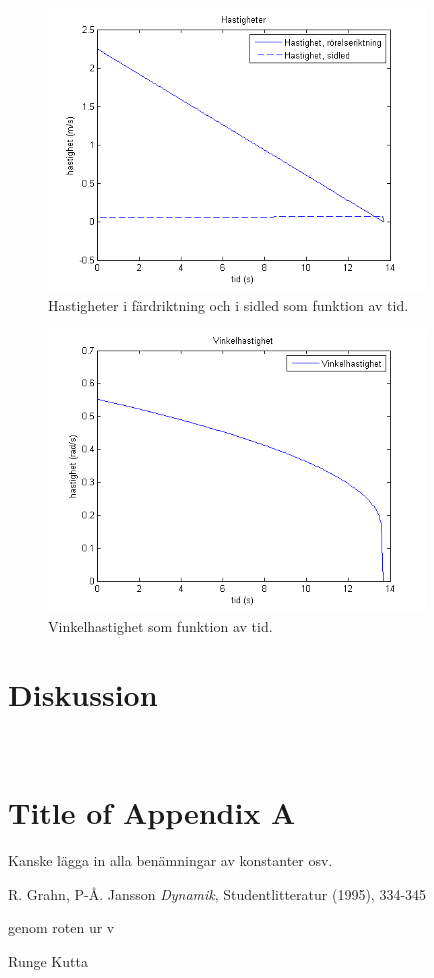 \documentclass[11pt]{article} %
\begin{document}
\begin{figure}[ht!]
\centering
\includegraphics[width=100mm]{hastigheter_tid_graf.png}
\caption{Hastigheter i färdriktning och i sidled som funktion av tid.}
\label{fig:hast_graf}
\label{overflow}
\end{figure}

\begin{figure}[ht!]
\centering
\includegraphics[width=100mm]{vinkelhastighet_tid_graf.png}
\caption{Vinkelhastighet som funktion av tid.}
\label{fig:vinkelhast_graf}
\label{overflow}
\end{figure}


\section{Diskussion}


\appendix
\section{\\Title of Appendix A} \label{App:AppendixA}
Kanske lägga in alla benämningar av konstanter osv.

\cite{Grahn}

\begin{thebibliography}{99}

 R. Grahn, P-Å. Jansson \emph{Dynamik}, Studentlitteratur (1995), 334-345 



genom roten ur v



Runge Kutta

\end{thebibliography}
\end{document}
